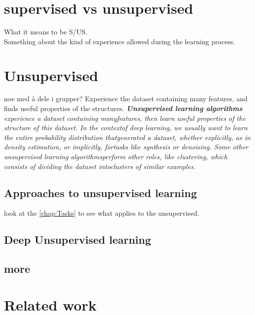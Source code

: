 \documentclass[a4paper,english]{ifimaster}
\begin{document}
\section{supervised vs unsupervised}
What it means to be S/US.\\
Something about the kind of experience allowed during the learning process.


\section{Unsupervised}
noe med å dele i grupper?
Experience the dataset containing many features, and finds useful properties of the structures. 
\textit{\textbf{Unsupervised learning algorithms} experience a dataset containing manyfeatures, then learn useful properties of the structure of this dataset. In the contextof deep learning, we usually want to learn the entire probability distribution thatgenerated a dataset, whether explicitly, as in density estimation, or implicitly, fortasks like synthesis or denoising. Some other unsupervised learning algorithmsperform other roles, like clustering, which consists of dividing the dataset intoclusters of similar examples.}
\cite{Goodfellow-et-al-2016}


\subsection{Approaches to unsupervised learning}
look at the \autoref{chap:Tasks} to see what applies to the unsupervised.

\subsection{Deep Unsupervised learning}
\subsection{more}
\section{Related work}


	      
		
		
		
		
		
		
		
		
		
		
		
		
		
		
		
\end{document}
